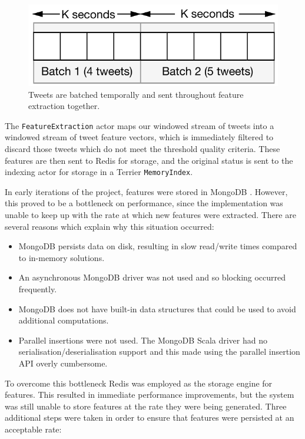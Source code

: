 \documentclass{l4proj}
\newcommand{\code}[1]{\texttt{#1}}
\begin{document}
\begin{figure}
\centering
\includegraphics[scale=0.8]{slidingwindow.pdf}
\caption{Tweets are batched temporally and sent throughout feature extraction together.}
\label{slidingwindow}
\end{figure}

        The \code{FeatureExtraction} actor maps our windowed stream of tweets into a windowed stream of tweet feature vectors, which is immediately filtered to discard those tweets which do not meet the threshold quality criteria. These features are then sent to Redis for storage, and the original status is sent to the indexing actor for storage in a Terrier \code{MemoryIndex}.
        
        In early iterations of the project, features were stored in MongoDB \cite{mongo}. However, this proved to be a bottleneck on performance, since the implementation was unable to keep up with the rate at which new features were extracted. There are several reasons which explain why this situation occurred:
        
        \begin{itemize}
        \item MongoDB persists data on disk, resulting in slow read/write times compared to in-memory solutions.
        \item An asynchronous MongoDB driver was not used and so blocking occurred frequently.
        \item MongoDB does not have built-in data structures that could be used to avoid additional computations.
        \item Parallel insertions were not used. The MongoDB Scala driver had no serialisation/deserialisation support and this made using the parallel insertion API overly cumbersome.
        \end{itemize}
        
        To overcome this bottleneck Redis \cite{redis} was employed as the storage engine for features. This resulted in immediate performance improvements, but the system was still unable to store features at the rate they were being generated. Three additional steps were taken in order to ensure that features were persisted at an acceptable rate:
        
\end{document}
